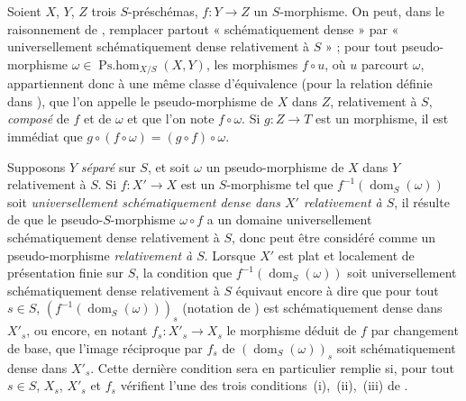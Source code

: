 \begin{env}[20.5.5]
\label{IV.20.5.5}
Soient $X$, $Y$, $Z$ trois $S$-préschémas, $f:Y\to Z$ un $S$-morphisme.
On peut, dans le raisonnement de , remplacer partout « schématiquement dense » par « universellement schématiquement dense relativement à $S$ » ; pour tout pseudo-morphisme $\omega\in\operatorname{Ps.hom}_{X/S}(X,Y)$, les morphismes $f\circ u$, où $u$ parcourt $\omega$, appartiennent donc à une même classe d'équivalence (pour la relation définie dans ), que l'on
appelle le pseudo-morphisme de $X$ dans $Z$, relativement à $S$, \emph{composé} de $f$ et de $\omega$ et que l'on note $f\circ\omega$.
Si $g:Z\to T$ est un morphisme, il est immédiat que $g\circ(f\circ\omega)=(g\circ f)\circ\omega$.
\end{env}

\begin{env}[20.5.6]
\label{IV.20.5.6}
Supposons $Y$ \emph{séparé} sur $S$, et soit $\omega$ un pseudo-morphisme de $X$ dans $Y$ relativement à $S$.
Si $f:X'\to X$ est un $S$-morphisme tel que $f^{-1}(\operatorname{dom}_S(\omega))$ soit \emph{universellement schématiquement dense dans $X'$ relativement à $S$}, il résulte de  que le pseudo-$S$-morphisme $\omega\circ f$ a un domaine universellement schématiquement dense relativement à $S$, donc  peut être considéré comme un pseudo-morphisme \emph{relativement à $S$}.
Lorsque $X'$ est plat et localement de présentation finie sur $S$, la condition que $f^{-1}(\operatorname{dom}_S(\omega))$ soit universellement schématiquement dense relativement à $S$ équivaut encore à dire que pour tout $s\in S$, $(f^{-1}(\operatorname{dom}_S(\omega)))_s$ (notation de ) est schématiquement dense dans $X'_s$, ou encore, en notant $f_s:X'_s\to X_s$ le morphisme déduit de $f$ par changement de base, que l'image réciproque par $f_s$ de $(\operatorname{dom}_S(\omega))_s$ soit schématiquement dense dans $X'_s$.
Cette dernière condition sera en particulier remplie si, pour tout $s\in S$, $X_s$, $X'_s$ et $f_s$ vérifient l'une des trois conditions~(i),~(ii),~(iii) de .
\end{env}

